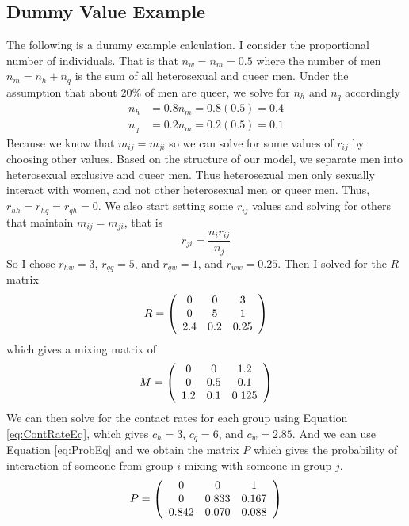 \documentclass[12pt]{article}
\begin{document}
\subsection*{Dummy Value Example}

The following is a dummy example calculation.  I consider the proportional number of individuals.  That is that $n_w=n_m=0.5$ where the number of men $n_m=n_h+n_q$ is the sum of all heterosexual and queer men.  Under the assumption that about 20\% of men are queer, we solve for $n_h$ and $n_q$ accordingly
\begin{align}
n_h&=0.8n_m = 0.8(0.5) = 0.4\\
n_q&=0.2n_m = 0.2(0.5) = 0.1
\end{align}
Because we know that $m_{ij}=m_{ji}$ so we can solve for some values of $r_{ij}$ by choosing other values.  Based on the structure of our model, we separate men into heterosexual exclusive and queer men.  Thus heterosexual men only sexually interact with women, and not other heterosexual men or queer men. Thus, $r_{hh}=r_{hq}=r_{qh}=0$.  We also start setting some $r_{ij}$ values and solving for others that maintain $m_{ij}=m_{ji}$, that is
\begin{equation}
r_{ji}=\frac{n_ir_{ij}}{n_j}
\end{equation}
So I chose $r_{hw}=3$, $r_{qq}=5$, and $r_{qw}=1$, and $r_{ww}=0.25$.  Then I solved for the $R$ matrix
\begin{equation}
R=\left(\begin{array}{c c c}
0 & 0 & 3 \\
0 & 5 & 1 \\
2.4 & 0.2 & 0.25
\end{array}\right)
\end{equation}
which gives a mixing matrix of 
\begin{equation}
M=\left(\begin{array}{c c c}
0 & 0 & 1.2 \\
0 & 0.5 & 0.1 \\
1.2 & 0.1 & 0.125
\end{array}\right)
\end{equation}
We can then solve for the contact rates for each group using Equation \eqref{eq:ContRateEq}, which gives $c_h=3$, $c_q=6$, and $c_w=2.85$. And we can use Equation \eqref{eq:ProbEq} and we obtain the matrix $P$ which gives the probability of interaction of someone from group $i$ mixing with someone in group $j$. 
\begin{equation}
P=\left(\begin{array}{c c c}
0 & 0 & 1 \\
0 & 0.833 & 0.167 \\
0.842 & 0.070 & 0.088
\end{array}\right)
\end{equation}
\end{document}
